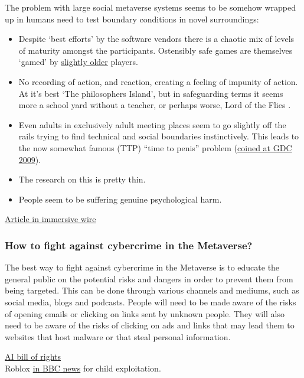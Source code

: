 The problem with large social metaverse systems seems to be somehow wrapped up in humans need to test boundary conditions in novel surroundings:
\begin{itemize}
\item Despite `best efforts' by the software vendors  there is a chaotic mix of levels of maturity amongst the participants. Ostensibly safe games are themselves `gamed' by \href{https://futurism.com/mom-horrified-her-kids-seeing-roblox}{slightly older} players.
\item No recording of action, and reaction, creating a feeling of impunity of action. At it's best `The philosophers Island', but in safeguarding terms it seems more a school yard without a teacher, or perhaps worse, Lord of the Flies \cite{cameron2012splendid}.
\item Even adults in exclusively adult meeting places seem to go slightly off the rails trying to find technical and social boundaries instinctively. This leads to the now somewhat famous (TTP) ``time to penis'' problem \cite{lamb2022second} (\href{http://gamedesignreviews.com/reviews/little-big-planet-browsing-content/}{coined at GDC 2009}). 
\item The research on this is pretty thin.
\item People seem to be suffering genuine psychological harm.
\end{itemize}
\href{https://www.immersivewire.com/p/harassment-metaverse-how-address}{Article in immersive wire}
\subsubsection{How to fight against cybercrime in the Metaverse?}
The best way to fight against cybercrime in the Metaverse is to educate the general public on the potential risks and dangers in order to prevent them from being targeted. This can be done through various channels and mediums, such as social media, blogs and podcasts. People will need to be made aware of the risks of opening emails or clicking on links sent by unknown people. They will also need to be aware of the risks of clicking on ads and links that may lead them to websites that host malware or that steal personal information.

\href{https://www.whitehouse.gov/ostp/ai-bill-of-rights/}{AI bill of rights}\\

Roblox \href{https://www.bbc.co.uk/news/technology-48450604}{in BBC news} for child exploitation.


